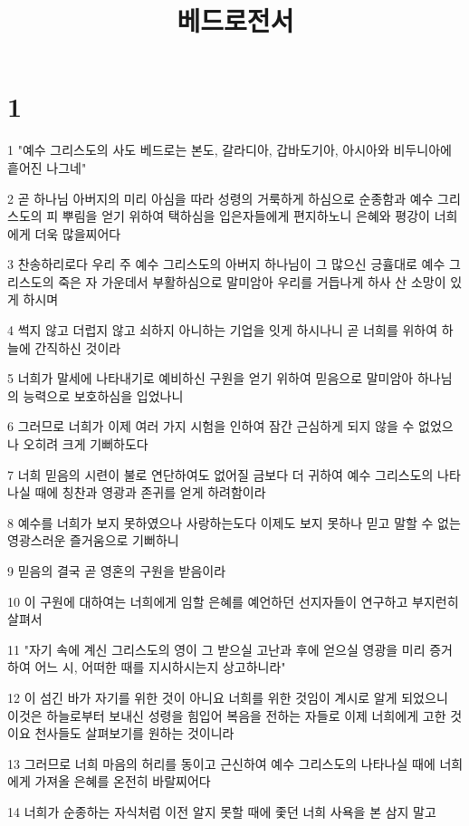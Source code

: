 

\title{베드로전서}


\chapter{1}

\par 1 "예수 그리스도의 사도 베드로는 본도, 갈라디아, 갑바도기아, 아시아와 비두니아에 흩어진 나그네"
\par 2 곧 하나님 아버지의 미리 아심을 따라 성령의 거룩하게 하심으로 순종함과 예수 그리스도의 피 뿌림을 얻기 위하여 택하심을 입은자들에게 편지하노니 은혜와 평강이 너희에게 더욱 많을찌어다
\par 3 찬송하리로다 우리 주 예수 그리스도의 아버지 하나님이 그 많으신 긍휼대로 예수 그리스도의 죽은 자 가운데서 부활하심으로 말미암아 우리를 거듭나게 하사 산 소망이 있게 하시며
\par 4 썩지 않고 더럽지 않고 쇠하지 아니하는 기업을 잇게 하시나니 곧 너희를 위하여 하늘에 간직하신 것이라
\par 5 너희가 말세에 나타내기로 예비하신 구원을 얻기 위하여 믿음으로 말미암아 하나님의 능력으로 보호하심을 입었나니
\par 6 그러므로 너희가 이제 여러 가지 시험을 인하여 잠간 근심하게 되지 않을 수 없었으나 오히려 크게 기뻐하도다
\par 7 너희 믿음의 시련이 불로 연단하여도 없어질 금보다 더 귀하여 예수 그리스도의 나타나실 때에 칭찬과 영광과 존귀를 얻게 하려함이라
\par 8 예수를 너희가 보지 못하였으나 사랑하는도다 이제도 보지 못하나 믿고 말할 수 없는 영광스러운 즐거움으로 기뻐하니
\par 9 믿음의 결국 곧 영혼의 구원을 받음이라
\par 10 이 구원에 대하여는 너희에게 임할 은혜를 예언하던 선지자들이 연구하고 부지런히 살펴서
\par 11 "자기 속에 계신 그리스도의 영이 그 받으실 고난과 후에 얻으실 영광을 미리 증거하여 어느 시, 어떠한 때를 지시하시는지 상고하니라"
\par 12 이 섬긴 바가 자기를 위한 것이 아니요 너희를 위한 것임이 계시로 알게 되었으니 이것은 하늘로부터 보내신 성령을 힘입어 복음을 전하는 자들로 이제 너희에게 고한 것이요 천사들도 살펴보기를 원하는 것이니라
\par 13 그러므로 너희 마음의 허리를 동이고 근신하여 예수 그리스도의 나타나실 때에 너희에게 가져올 은혜를 온전히 바랄찌어다
\par 14 너희가 순종하는 자식처럼 이전 알지 못할 때에 좇던 너희 사욕을 본 삼지 말고

